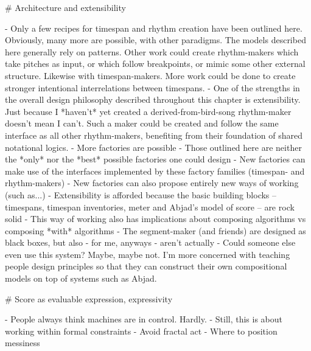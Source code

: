 \begin{markdown}
# Architecture and extensibility

-   Only a few recipes for timespan and rhythm creation have been outlined
    here. Obviously, many more are possible, with other paradigms. The models
    described here generally rely on patterns. Other work could create
    rhythm-makers which take pitches as input, or which follow breakpoints, or
    mimic some other external structure. Likewise with timespan-makers. More
    work could be done to create stronger intentional interrelations between
    timespans.
-   One of the strengths in the overall design philosophy described throughout
    this chapter is extensibility. Just because I *haven't* yet created a
    derived-from-bird-song rhythm-maker doesn't mean I can't. Such a maker
    could be created and follow the same interface as all other rhythm-makers,
    benefiting from their foundation of shared notational logics.
-   More factories are possible
-   Those outlined here are neither the *only* nor the *best* possible
    factories one could design
-   New factories can make use of the interfaces implemented by these
    factory families (timespan- and rhythm-makers)
-   New factories can also propose entirely new ways of working
    (such as...)
-   Extensibility is afforded because the basic building blocks --
    timespans, timespan inventories, meter and Abjad's model of score --
    are rock solid
-   This way of working also has implications about composing algorithms vs
    composing *with* algorithms
-   The segment-maker (and friends) are designed as black boxes, but also - for
    me, anyways - aren't actually
-   Could someone else even use this system? Maybe, maybe not. I'm more
    concerned with teaching people design principles so that they can construct
    their own compositional models on top of systems such as Abjad.

# Score as evaluable expression, expressivity

-   People always think machines are in control. Hardly.
-   Still, this is about working within formal constraints
-   Avoid fractal act
-   Where to position messiness

\end{markdown}